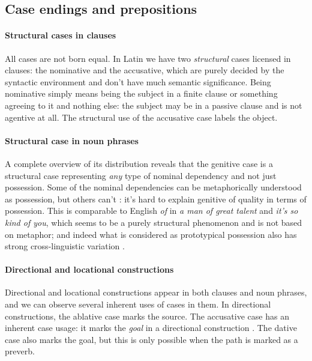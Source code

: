 \documentclass[a4paper, oneside, 12pt]{report}
\newcommand*{\citepage}[1]{p.~{#1}}
\newcommand*{\citepages}[1]{pp.~{#1}}
\newcommand*{\term}[1]{\emph{#1}}
\newcommand{\form}[1]{\emph{#1}}
\begin{document}
\subsection{Case endings and prepositions}\label{sec:grammatical.np.case}

\paragraph*{Structural cases in clauses}
All cases are not born equal. 
In Latin we have two \emph{structural} cases licensed in clauses: the nominative and the accusative,
which are purely decided by the syntactic environment 
and don't have much semantic significance.
Being nominative simply means being the subject in a finite clause or something agreeing to it 
and nothing else: 
the subject may be in a passive clause and is not agentive at all.
The structural use of the accusative case labels the object.

\paragraph*{Structural case in noun phrases}
A complete overview of its distribution reveals that 
the genitive case is a structural case 
representing \emph{any} type of nominal dependency 
and not just possession.
Some of the nominal dependencies can be 
metaphorically understood as possession, 
but others can't \citep[\citepage{244}]{oniga2014latin}:
it's hard to explain genitive of quality 
in terms of possession.
This is comparable to English \form{of}
in \form{a man of great talent} and \form{it's so kind of you},
which seems to be a purely structural phenomenon
and is not based on metaphor;
and indeed what is considered as prototypical possession 
also has strong cross-linguistic variation 
\citep[\citepages{262-263}]{dixon2010basic2}.

\paragraph*{Directional and locational constructions}
Directional and locational constructions appear in both clauses and noun phrases,
and we can observe several inherent uses of cases in them.
In directional constructions, the ablative case marks the source.
The accusative case has an inherent case usage:
it marks the \term{goal} in a directional construction
\citep[\citepage{238}]{oniga2014latin}.
The dative case also marks the goal,
but this is only possible when the path is marked as a preverb.
\end{document}
